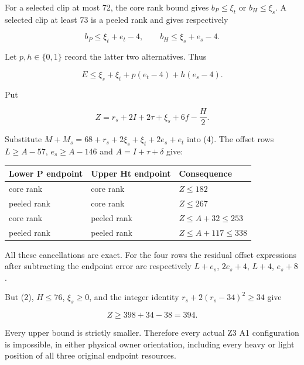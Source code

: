 \documentclass[10pt,a4paper]{article}
\theoremstyle{definition}
\begin{document}
For a selected clip at most 72,\allowbreak{} the core rank bound gives
\(b_P\le\xi_t\) or \(b_H\le\xi_s\). A selected clip at least 73 is a
peeled rank and gives respectively

\[
b_P\le\xi_t+\allowbreak{}e_t-4,\allowbreak{}\qquad b_H\le\xi_s+\allowbreak{}e_s-4.
\]

Let \(p,\allowbreak{}h\in\{0,\allowbreak{}1\}\) record the latter two alternatives. Thus

\[
E\le\xi_s+\allowbreak{}\xi_t+\allowbreak{}p(e_t-4)+\allowbreak{}h(e_s-4).
\]

Put

\[
Z=\allowbreak{}r_s+\allowbreak{}2I+\allowbreak{}2\tau+\allowbreak{}\xi_s+\allowbreak{}6f-\frac H2.
\]

Substitute \(M+\allowbreak{}M_s=\allowbreak{}68+\allowbreak{}r_s+\allowbreak{}2\xi_s+\allowbreak{}\xi_t+\allowbreak{}2e_s+\allowbreak{}e_t\) into (4). The offset
rows \(L\ge A-57\),\allowbreak{} \(e_s\ge A-146\) and \(A=\allowbreak{}I+\allowbreak{}\tau+\allowbreak{}\delta\) give:

\begin{longtable}[]{@{}lll@{}}
\toprule\noalign{}
Lower P endpoint & Upper Ht endpoint & Consequence \\
\midrule\noalign{}
\endhead
\bottomrule\noalign{}
\endlastfoot
core rank & core rank & \(Z\le182\) \\
peeled rank & core rank & \(Z\le267\) \\
core rank & peeled rank & \(Z\le A+\allowbreak{}32\le253\) \\
peeled rank & peeled rank & \(Z\le A+\allowbreak{}117\le338\) \\
\end{longtable}

All these cancellations are exact. For the four rows the residual offset
expressions after subtracting the endpoint error are respectively
\(L+\allowbreak{}e_s\),\allowbreak{} \(2e_s+\allowbreak{}4\),\allowbreak{} \(L+\allowbreak{}4\),\allowbreak{} \(e_s+\allowbreak{}8\).

But (2),\allowbreak{} \(H\le76\),\allowbreak{} \(\xi_s\ge0\),\allowbreak{} and the integer identity
\(r_s+\allowbreak{}2(r_s-34)^2\ge34\) give

\[
Z\ge398+\allowbreak{}34-38=\allowbreak{}394.
\]

Every upper bound is strictly smaller. Therefore every actual Z3 A1
configuration is impossible,\allowbreak{} in either physical owner orientation,\allowbreak{}
including every heavy or light position of all three original endpoint
resources.
\end{document}
